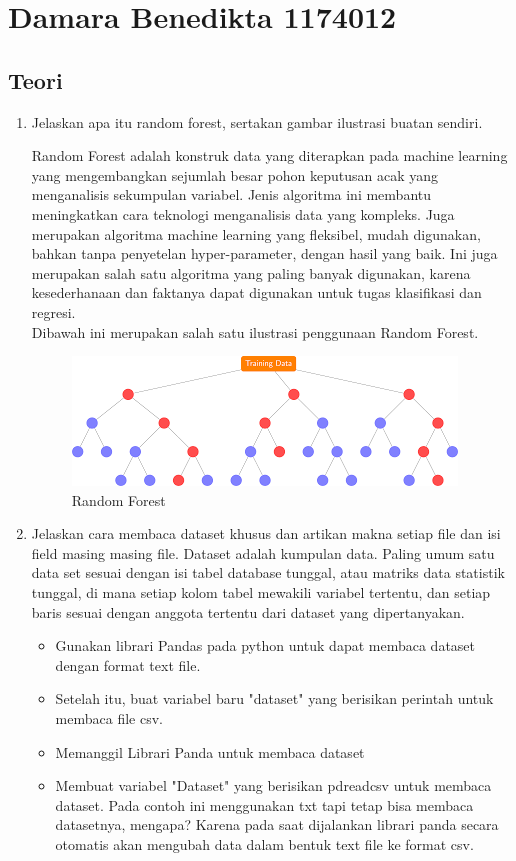\section{Damara Benedikta 1174012}

\subsection{Teori}
\begin{enumerate}
\item Jelaskan apa itu random forest, sertakan gambar ilustrasi buatan sendiri.\par
Random Forest adalah konstruk data yang diterapkan pada machine learning yang mengembangkan sejumlah besar pohon keputusan acak yang menganalisis sekumpulan variabel. Jenis algoritma ini membantu meningkatkan cara teknologi menganalisis data yang kompleks. Juga merupakan algoritma machine learning yang fleksibel, mudah digunakan, bahkan tanpa penyetelan hyper-parameter, dengan hasil yang baik. Ini juga merupakan salah satu algoritma yang paling banyak digunakan, karena kesederhanaan dan faktanya dapat digunakan untuk tugas klasifikasi dan regresi.\\
Dibawah ini merupakan salah satu ilustrasi penggunaan Random Forest.
\begin{figure}[ht]
\centering
\includegraphics[scale=0.5]{figures/1174012/3/teori1.png}
\caption{Random Forest}
\label{contoh}
\end{figure}

\item Jelaskan cara membaca dataset khusus dan artikan makna setiap file dan isi field masing masing file.
Dataset adalah kumpulan data. Paling umum satu data set sesuai dengan isi tabel database tunggal, atau matriks data statistik tunggal, di mana setiap kolom tabel mewakili variabel tertentu, dan setiap baris sesuai dengan anggota tertentu dari dataset yang dipertanyakan.
\begin{itemize}
\item
Gunakan librari Pandas pada python untuk dapat membaca dataset dengan format text file.
\item
Setelah itu, buat variabel baru "dataset" yang berisikan perintah untuk membaca file csv.
\item
Memanggil Librari Panda untuk membaca dataset
\item
Membuat variabel "Dataset" yang berisikan pdreadcsv untuk membaca dataset. Pada contoh ini menggunakan txt tapi tetap bisa membaca datasetnya, mengapa? Karena pada saat dijalankan librari panda secara otomatis akan mengubah data dalam bentuk text file ke format csv.
\end{itemize}


\end{enumerate}
